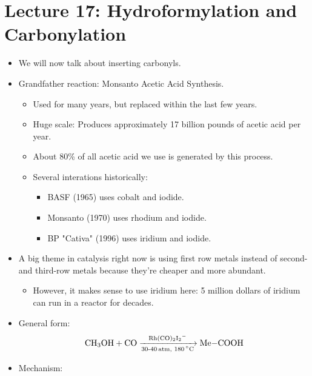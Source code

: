 \documentclass[../notes.tex]{subfiles}
\begin{document}
\section{Lecture 17: Hydroformylation and Carbonylation}
\begin{itemize}
    \item {}We will now talk about inserting carbonyls.
    \item Grandfather reaction: Monsanto Acetic Acid Synthesis.
    \begin{itemize}
        \item Used for many years, but replaced within the last few years.
        \item Huge scale: Produces approximately 17 billion pounds of acetic acid per year.
        \item About 80\% of all acetic acid we use is generated by this process.
        \item Several interations historically:
        \begin{itemize}
            \item BASF (1965) uses cobalt and iodide.
            \item Monsanto (1970) uses rhodium and iodide.
            \item BP "Cativa" (1996) uses iridium and iodide.
        \end{itemize}
    \end{itemize}
    \item A big theme in catalysis right now is using first row metals instead of second- and third-row metals because they're cheaper and more abundant.
    \begin{itemize}
        \item However, it makes sense to use iridium here: 5 million dollars of iridium can run in a reactor for decades.
    \end{itemize}
    \item General form:
    \begin{equation*}
        \ce{CH3OH + CO ->[Rh(CO)2I2-][{30-$\SI{40}{atm}$, $\SI{180}{\celsius}$}] Me-COOH}
    \end{equation*}
    \item Mechanism:
    

\end{itemize}
\end{document}
